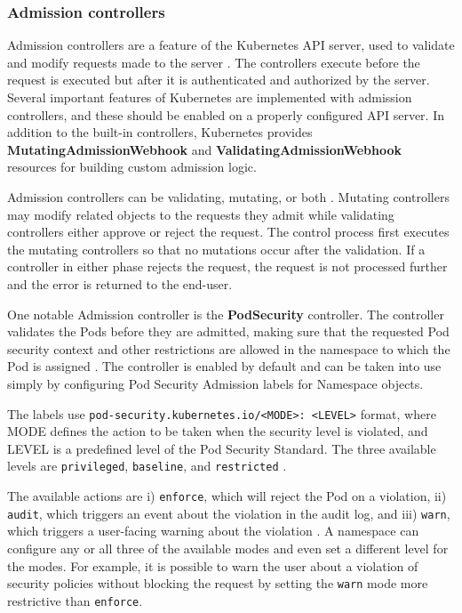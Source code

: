 \documentclass[english, 12pt, a4paper, sci, utf8, a-2b, online]{aaltothesis}
\begin{document}
\subsubsection{Admission controllers} \label{admission-controllers}

Admission controllers are a feature of the Kubernetes API server, used to validate and modify requests made to the server \cite{k8s-docs-admission}.
The controllers execute before the request is executed but after it is authenticated and authorized by the server.
Several important features of Kubernetes are implemented with admission controllers, and these should be enabled on a properly configured API server.
In addition to the built-in controllers, Kubernetes provides \textbf{MutatingAdmissionWebhook} and \textbf{ValidatingAdmissionWebhook} resources for building custom admission logic.

Admission controllers can be validating, mutating, or both \cite{k8s-docs-admission}.
Mutating controllers may modify related objects to the requests they admit while validating controllers either approve or reject the request.
The control process first executes the mutating controllers so that no mutations occur after the validation.
If a controller in either phase rejects the request, the request is not processed further and the error is returned to the end-user.

One notable Admission controller is the \textbf{PodSecurity} controller.
The controller validates the Pods before they are admitted, making sure that the requested Pod security context and other restrictions are allowed in the namespace to which the Pod is assigned \cite{k8s-docs-admission}.
The controller is enabled by default and can be taken into use simply by configuring Pod Security Admission labels for Namespace objects.

The labels use \lstinline{pod-security.kubernetes.io/<MODE>: <LEVEL>} format, where MODE defines the action to be taken when the security level is violated, and LEVEL is a predefined level of the Pod Security Standard.
The three available levels are \lstinline{privileged}, \lstinline{baseline}, and \lstinline{restricted} \cite{k8s-docs-pss}.

The available actions are i) \lstinline{enforce}, which will reject the Pod on a violation, ii) \lstinline{audit}, which triggers an event about the violation in the audit log, and iii) \lstinline{warn}, which triggers a user-facing warning about the violation \cite{k8s-docs-psa}.
A namespace can configure any or all three of the available modes and even set a different level for the modes.
For example, it is possible to warn the user about a violation of security policies without blocking the request by setting the \lstinline{warn} mode more restrictive than \lstinline{enforce}.
\end{document}

